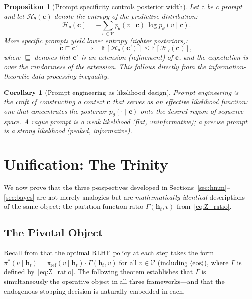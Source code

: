 \documentclass[11pt,a4paper]{article}
\theoremstyle{plain}
\newtheorem{proposition}[theorem]{Proposition}
\newtheorem{corollary}[theorem]{Corollary}
\theoremstyle{definition}
\theoremstyle{remark}
\newcommand{\E}{\mathbb{E}}
\newcommand{\cH}{\mathcal{H}}
\newcommand{\vocab}{\mathcal{V}}
\begin{document}
\begin{proposition}[Prompt specificity controls posterior width]\label{prop:prompt}
Let $\bm{c}$ be a prompt and let $\cH_\theta(\bm{c})$ denote the entropy of
the predictive distribution:
\[
  \cH_\theta(\bm{c})
  = -\sum_{v \in \vocab} p_\theta(v \mid \bm{c})\, \log p_\theta(v \mid \bm{c}).
\]
More specific prompts yield lower entropy (tighter posteriors):
\[
  \bm{c} \sqsubseteq \bm{c}' \quad \Longrightarrow \quad
  \E[\cH_\theta(\bm{c}')] \leq \E[\cH_\theta(\bm{c})],
\]
where $\sqsubseteq$ denotes that $\bm{c}'$ is an extension (refinement) of
$\bm{c}$, and the expectation is over the randomness of the extension.
This follows directly from the information-theoretic data processing inequality.
\end{proposition}

\begin{corollary}[Prompt engineering as likelihood design]
Prompt engineering is the craft of constructing a context $\bm{c}$ that serves
as an effective likelihood function: one that concentrates the posterior
$p_\theta(\cdot \mid \bm{c})$ onto the desired region of sequence space.
A vague prompt is a weak likelihood (flat, uninformative); a precise prompt
is a strong likelihood (peaked, informative).
\end{corollary}

\section{Unification: The Trinity}\label{sec:unify}

We now prove that the three perspectives developed in
Sections~\ref{sec:hmm}--\ref{sec:bayes} are not merely analogies but are
\emph{mathematically identical} descriptions of the same object: the
partition-function ratio $\Gamma(\bm{h}_t, v)$ from~\eqref{eq:Z_ratio}.

\subsection{The Pivotal Object}

Recall from  that the optimal RLHF policy at each
step takes the form
$\pi^*(v \mid \bm{h}_t)
= \pi_{\mathrm{ref}}(v \mid \bm{h}_t) \cdot \Gamma(\bm{h}_t, v)$
for all $v \in \vocab$ (including $\langle\mathrm{eos}\rangle$), where
$\Gamma$ is defined by~\eqref{eq:Z_ratio}. The following theorem
establishes that $\Gamma$ is simultaneously the operative object in all
three frameworks---and that the endogenous stopping decision is naturally
embedded in each.
\end{document}

